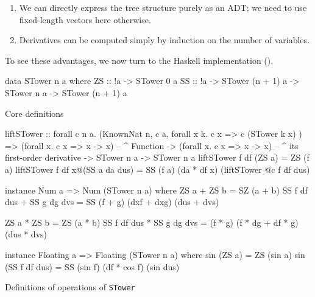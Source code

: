 \documentclass[./rims-smooth-paper.tex]{subfiles}
\begin{document}
\begin{enumerate}
\item We can directly express the tree structure purely as an ADT; we need to use fixed-length vectors here otherwise.\label{item:adt-friendly}
\item Derivatives can be computed simply by induction on the number of variables.\label{item:recurse}
\end{enumerate}

To see these advantages, we now turn to the Haskell implementation ().
\begin{listing}[tbp]
\begin{code}
data STower n a where
  ZS :: !a -> STower 0 a
  SS :: !a -> STower (n + 1) a -> STower n a -> STower (n + 1) a
\end{code}
\caption{Core definitions\label{lst:data-def}}
\end{listing}

\begin{listing}[htbp]
\begin{code}
liftSTower
  :: forall c n a. (KnownNat n, c a, forall x k. c x => c (STower k x) )
  => (forall x. c x => x -> x)
      -- ^ Function
  -> (forall x. c x => x -> x)
      -- ^ its first-order derivative
  -> STower n a
  -> STower n a
liftSTower f df (ZS a) = ZS (f a)
liftSTower f df x@(SS a da dus) = SS (f a) (da * df x) (liftSTower @c f df dus)

instance Num a => Num (STower n a) where
  ZS a + ZS b = SZ (a + b)
  SS f df dus + SS g dg dvs = SS (f + g) (dxf + dxg) (dus + dvs)

  ZS a * ZS b = ZS (a * b)
  SS f df dus * SS g dg dvs = (f * g) (f * dg + df * g) (dus * dvs)

instance Floating a => Floating (STower n a) where
  sin (ZS a) = ZS (sin a)
  sin (SS f df dus) = SS (sin f) (df * cos f) (sin dus)
\end{code}
\caption{Definitions of operations of \texttt{STower}\label{lst:ops-def}}
\end{listing}
\end{document}

